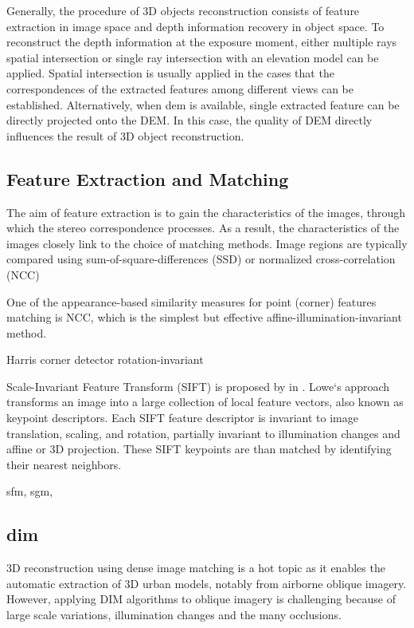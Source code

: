 Generally, the procedure of 3D objects reconstruction consists of feature extraction in image space and depth information recovery in object space. 
To reconstruct the depth information at the exposure moment, either multiple rays spatial intersection or single ray intersection with an elevation model can be applied.
Spatial intersection is usually applied in the cases that the correspondences of the extracted features among different views can be established. Alternatively, when \gls{dem} is available, single extracted feature can be directly projected onto the DEM. In this case, the quality of DEM directly influences the result of 3D object reconstruction. 

\subsection{Feature Extraction and Matching}
The aim of feature extraction is to gain the characteristics of the images, through which the stereo correspondence processes. As a result, the characteristics of the images closely link to the choice of matching methods. %
Image regions are typically compared using sum-of-square-differences (SSD) or normalized cross-correlation (NCC)

One of the appearance-based similarity measures for point (corner) features matching is NCC, which is the simplest but effective affine-illumination-invariant method. 

Harris corner detector rotation-invariant

Scale-Invariant Feature Transform (SIFT) is proposed by \citeauthor{LoweSep1999} in \citeyear{LoweSep1999} \cite{LoweSep1999}. Lowe‘s approach transforms an image into a large collection of local feature vectors, also known as keypoint descriptors. Each SIFT feature descriptor is invariant to image translation, scaling, and rotation, partially invariant to illumination changes and affine or 3D projection. These SIFT keypoints are than matched by identifying their nearest neighbors.


sfm, sgm, 

\subsection{\gls{dim}}
3D reconstruction using dense image matching is a hot topic as it enables the automatic extraction of 3D urban models, notably from airborne oblique imagery. However, applying DIM algorithms to oblique imagery is challenging because of large scale variations, illumination changes and the many occlusions.

